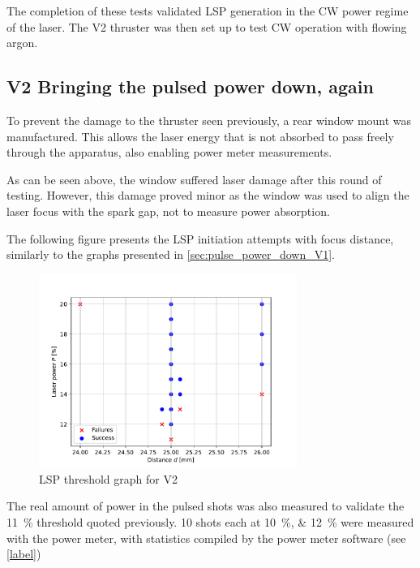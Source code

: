 
            The completion of these tests validated LSP generation in the CW power regime of the laser. The V2 thruster was then set up to test CW operation with flowing argon.

        \subsection{V2 Bringing the pulsed power down, again}

            To prevent the damage to the thruster seen previously, a rear window mount was manufactured. This allows the laser energy that is not absorbed to pass freely through the apparatus, also enabling power meter measurements. 
            

            As can be seen above, the window suffered laser damage after this round of testing. However, this damage proved minor as the window was used to align the laser focus with the spark gap, not to measure power absorption.
            
            The following figure presents the LSP initiation attempts with focus distance, similarly to the graphs presented in \autoref{sec:pulse_power_down_V1}.

            \begin{figure}[!ht]
                \centering
                \includegraphics[width=0.75\textwidth]{assets/4 experiments/V2_focus_threshold.pdf}
                \caption{LSP threshold graph for V2}
            \end{figure}

            The real amount of power in the pulsed shots was also measured to validate the \qty{11}{\%} threshold quoted previously. 10 shots each at \qtylist{10; 12}{\%} were measured with the power meter, with statistics compiled by the power meter software (see \autoref{label})

